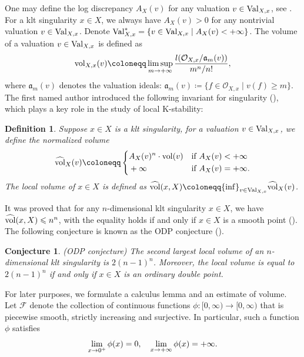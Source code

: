 \documentclass[12pt]{amsart}
\newcommand{\hvol}{{\widehat{\rm vol}}}
\newtheorem{defi}[thm]{Definition}
\newtheorem{conj}[thm]{Conjecture}
\theoremstyle{definition}
\def\inf{{\rm inf}}
\def\lim{{\rm lim}}
\def\limsup{{\rm lim\,sup}}
\def\vol{{\rm vol}}
\def\Val{{\rm Val}}
\def\val{{\rm Val}}
\newcommand{\CO}{{\mathcal O}}
\newcommand{\lee}{\leqslant}
\newcommand{\D}{\Delta}
\begin{document}
One may define the log discrepancy $A_{X}(v)$ for any valuation $v\in \val_{X,x}$, see \cite[Section 5.1]{JM12}. For a klt singularity $x\in X$, we always have $A_{X}(v)>0$ for any nontrivial valuation $v\in\Val_{X,x}$. Denote $\val^*_{X,x}=\{v\in \val_{X,x}\mid A_{X}(v)<+\infty\}$. The volume of a valuation $v\in \val_{X,x}$ is defined as
\begin{eqnarray*}
    \vol_{X,x}(v) \coloneqq \mathop{\limsup}_{m\rightarrow +\infty} \frac{l(\CO_{X,x}/\mathfrak{a}_m(v))}{m^n/n!},
\end{eqnarray*} 
where $\mathfrak{a}_m(v)$ denotes the valuation ideals:  $\mathfrak{a}_m(v)\coloneqq \{f\in \CO_{X,x}\mid v(f)\geq m\}$. The first named author introduced the following invariant for singularity (\cite{Li18}), which plays a key role in the study of local K-stability:
\begin{defi}
    Suppose $x \in X$ is a klt singularity, for a valuation $v \in \val_{X,x}$, we define the normalized volume 
    \begin{eqnarray*}
        \hvol_{X}(v)\coloneqq 
        \left\{\begin{aligned}
            &A_{X}(v)^n\cdot \vol(v)&\text{if}\ & A_X(v)<+\infty \\
            & +\infty & \text{if}\ & A_X(v)=+\infty.
        \end{aligned}\right.
    \end{eqnarray*}
    The local volume of $x \in X$ is defined as $\hvol(x,X)\coloneqq \inf_{v\in \Val_{X,x}} \hvol_{X}(v)$.
\end{defi}
It was proved that for any $n$-dimensional klt singularity $x\in X$, we have $\hvol(x,X)\lee n^n$, with the equality holds if and only if $x\in X$ is a smooth point (\cite{LX19}). The following conjecture is known as the ODP conjecture (\cite{SS17,LX19}).
\begin{conj}\label{conj:ODP}(ODP conjecture)
    The second largest local volume of an $n$-dimensional klt singularity is $2(n-1)^n$. Moreover, the local volume is equal to $2(n-1)^n$ if and only if $x\in X$ is an ordinary double point.
\end{conj}
For later purposes, we formulate a calculus lemma and an estimate of volume. 
Let $\mathscr{F}$ denote the collection of continuous functions $\phi: [0, \infty)\rightarrow [0, \infty)$ that is piecewise smooth, strictly increasing and surjective. In particular, such a function $\phi$ satisfies 
 \begin{equation}\label{eq-0inflim}
       \mathop{\lim}_{x\rightarrow 0^+}\phi(x)=0, \quad \mathop{\lim}_{x\rightarrow+\infty}\phi(x)=+\infty. 
    \end{equation}
\end{document}
